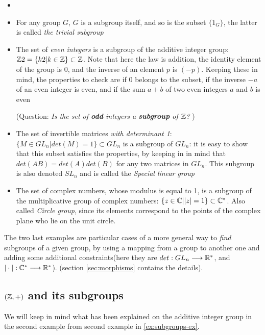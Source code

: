 \begin{example}
    \begin{itemize} \label{ex:subgroups-ex}
        \item[]
 \item For any group $G$, $G$ is a subgroup itself, and so is the subset $\{1_G\}$, the latter is called \textit{the trivial subgroup}
        \item The set of \textit{even integers} is a subgroup of the additive integer group: $\mathbb{Z}2 = \{k2 | k \in \mathbb{Z}\} \subset \mathbb{Z}$.
        Note that here the law is addition, the identity element of the group is $0$, and the inverse of an element $p$ is $(-p)$. Keeping these in mind, the properties to check are if $0$ belongs to the subset, if the inverse $-a$ of an even integer is even, and if the sum $a + b$ of two even integers $a$ and $b$ is even
        
        (Question: \textit{Is the set of \textbf{odd} integers a \textbf{subgroup} of $\mathbb{Z}$?} \label{ex:subgroup-even-int})
    \item The set of invertible matrices \textit{with determinant 1}: $\{M \in GL_n | det(M) = 1\} \subset GL_n$ is a subgroup of $GL_n$: it is easy to show that this subset satisfies the properties, by keeping in in mind that $det(AB) = det(A)det(B)$ for any two matrices in $GL_n$. This subgroup is also denoted $SL_n$ and is called the \textit{Special linear group}
    \item The set of complex numbers, whose modulus is equal to 1, is a subgroup of the multiplicative group of complex numbers: $\{z \in \mathbb{C} | |z| = 1\} \subset \mathbb{C}^*$. Also called \textit{Circle group}, since its elements correspond to the points of the complex plane who lie on the unit circle.
    \end{itemize}
\end{example}
The two last examples are particular cases of a more general way to \textit{find} subgroups of a given group, by using a mapping from a group to another one and adding some additional constraints(here they are $det: GL_n \longrightarrow \mathbb{R}^*$, and $|\cdot|: \mathbb{C}^* \longrightarrow \mathbb{R}^*$). (section \ref{sec:morphisms} contains the details).

\subsection{$(\mathbb{Z}, +)$ and its subgroups}
We will keep in mind what has been explained on the additive integer group in the second example from second example in \ref{ex:subgroups-ex}.

